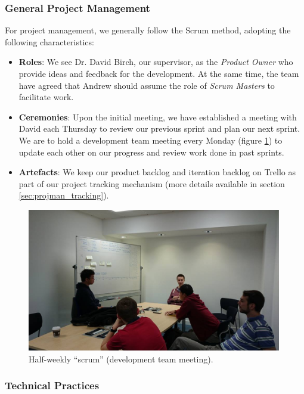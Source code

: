 ﻿\documentclass[a4paper, titlepage]{article}
\begin{document}
\subsubsection{General Project Management}

For project management, we generally follow the Scrum method, adopting the
following characteristics:
\begin{itemize}
  \item \textbf{Roles}: We see Dr. David Birch, our supervisor, as the \textit{Product Owner}
        who provide ideas and feedback for the development. At the same time,
        the team have agreed that Andrew should assume the role of
        \textit{Scrum Masters} to facilitate work.
  \item \textbf{Ceremonies}: Upon the initial meeting, we have established a
        meeting with David each Thursday to review our previous sprint 
        and plan our next sprint. We are to hold a development team
        meeting every Monday (figure \ref{fig:projman_scrum}) to update each other 
        on our progress and review work done in past sprints.
  \item \textbf{Artefacts}: We keep our product backlog and iteration backlog on
        Trello as part of our project tracking mechanism (more details
        available in section \ref{sec:projman_tracking}).
\end{itemize}


\begin{figure}[ht]
  \centering
    \includegraphics[width = 0.99\textwidth, trim= 0 0 0 3cm, clip]{./projman/scrum.jpg}
  \caption{Half-weekly ``scrum'' (development team meeting).}
  \label{fig:projman_scrum}
\end{figure}

\subsubsection{Technical Practices}
\end{document}
